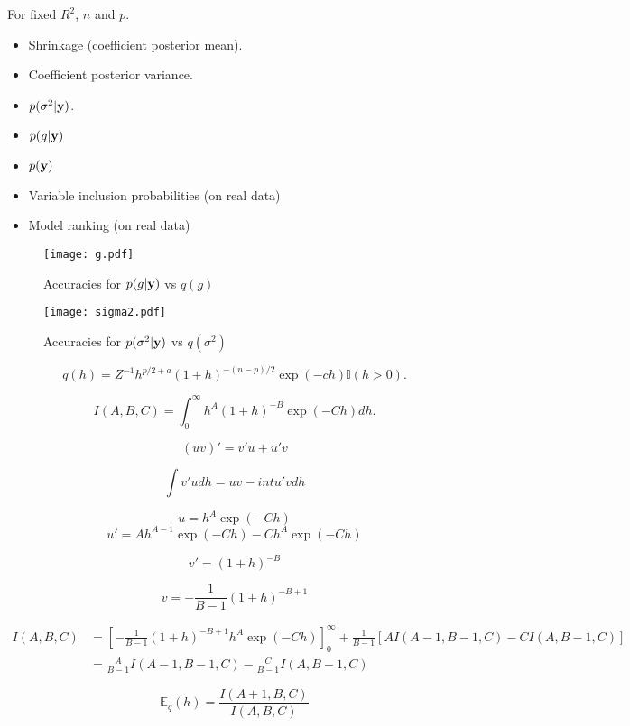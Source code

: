 \documentclass{article}
\def\vectorfontone{\bf}
\def\vy{{\vectorfontone y}}                      %
\def\bE{{\mathbb E}}                             %
\def\bI{{\mathbb I}}                             %
\def\ds{\displaystyle}
\begin{document}
For fixed $R^2$, $n$ and $p$.
\begin{itemize}
\item Shrinkage (coefficient posterior mean).
\item Coefficient posterior variance.
\item $p(\sigma^2|\vy)$.
\item $p(g|\vy)$
\item $p(\vy)$
\item Variable inclusion probabilities (on real data)
\item Model ranking (on real data)
\end{itemize}



\begin{figure}[ht]
	\centering
	\texttt{[image: g.pdf]}
	\caption{Accuracies for $p(g|\vy)$ vs $q(g)$}
	\label{fig:03}
\end{figure}

\begin{figure}[ht]
	\centering
	\texttt{[image: sigma2.pdf]}
	\caption{Accuracies for $p(\sigma^2|\vy)$ vs $q(\sigma^2)$}
	\label{fig:03}
\end{figure}



$$
q(h) = Z^{-1} h^{p/2 + a}(1+h)^{-(n-p)/2}\exp(-ch) \bI(h>0).
$$

$$
I(A,B,C) = \int_0^\infty h^{A}(1+h)^{-B}\exp(-Ch) dh.
$$

$$
(uv)' = v'u + u'v
$$

$$
\int v'u dh = uv - int u'v  dh
$$

$$
u = h^{A}\exp(-Ch) 
$$
$$
u' = A h^{A - 1} \exp(-Ch) - Ch^{A}\exp(-Ch) 
$$

$$
v' = (1 + h)^{-B}
$$

$$
v = -\frac{1}{B-1} (1 + h)^{-B+1}
$$

$$
\begin{array}{rl}
\ds I(A,B,C) 
& \ds = 
\left[ -\frac{1}{B-1} (1 + h)^{-B+1} h^{A}\exp(-Ch)  \right]_0^\infty 
+ \frac{1}{B-1}[A I(A-1,B-1,C) - C I(A,B-1,C)]
\\
& \ds = \frac{A}{B-1}I(A-1,B-1,C) - \frac{C}{B-1} I(A,B-1,C) 
\end{array}
$$

$$
\bE_q(h) = \frac{I(A+1,B,C)}{I(A,B,C)} 
$$
\end{document}
